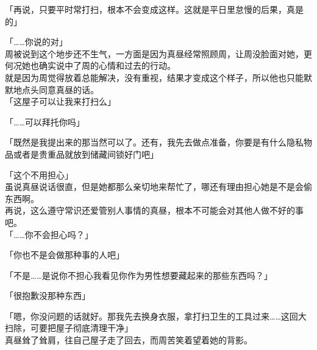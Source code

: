 「再说，只要平时常打扫，根本不会变成这样。这就是平日里怠慢的后果，真是的」

「……你说的对」\\

周被说到这个地步还不生气，一方面是因为真昼经常照顾周，让周没脸面对她，更何况她也确实说中了周的心情和过去的行动。\\

就是因为周觉得放着总能解决，没有重视，结果才变成这个样子，所以他也只能默默地点头同意真昼的话。\\

「这屋子可以让我来打扫么」

「……可以拜托你吗」

「既然是我提出来的那当然可以了。还有，我先去做点准备，你要是有什么隐私物品或者是贵重品就放到储藏间锁好门吧」

「这个不用担心」\\

虽说真昼说话很直，但是她都那么亲切地来帮忙了，哪还有理由担心她是不是会偷东西啊。\\

再说，这么遵守常识还爱管别人事情的真昼，根本不可能会对其他人做不好的事吧。\\

「……你不会担心吗？」

「你也不是会做那种事的人吧」

「不是……是说你不担心我看见你作为男性想要藏起来的那些东西吗？」

「很抱歉没那种东西」

「嗯，你没问题的话就好。那我先去换身衣服，拿打扫卫生的工具过来……这回大扫除，可要把屋子彻底清理干净」\\

真昼耸了耸肩，往自己屋子走了回去，而周苦笑着望着她的背影。
